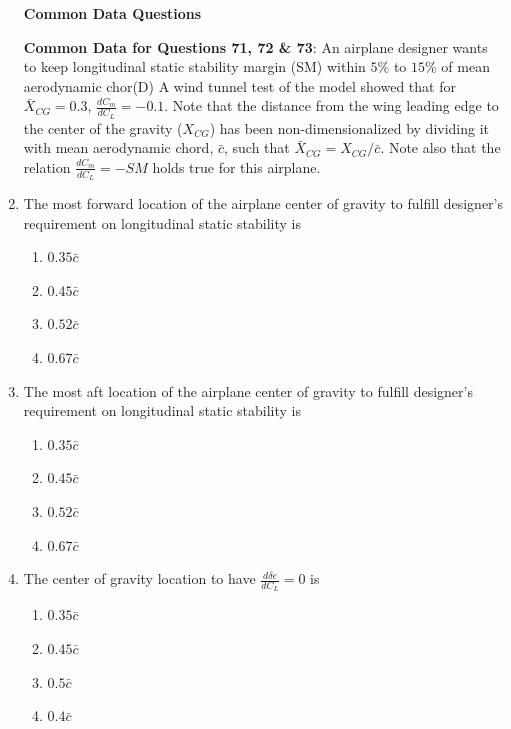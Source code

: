\documentclass{article}
\begin{document}
\begin{enumerate}
\begin{center}
    \textbf{Common Data Questions}
\end{center}


\textbf{Common Data for Questions 71, 72 \& 73}: An airplane designer wants to keep longitudinal static stability margin (SM) within $5\%$ to $15\%$ of mean aerodynamic chor(D) A wind tunnel test of the model showed that for $\bar{X}_{CG} = 0.3$, $\frac{d C_m}{d C_L} = -0.1$. Note that the distance from the wing leading edge to the center of the gravity ($X_{CG}$) has been non-dimensionalized by dividing it with mean aerodynamic chord, $\bar{c}$, such that $\bar{X}_{CG} = X_{CG} / \bar{c}$. Note also that the relation $\frac{d C_m}{d C_L} = -SM$ holds true for this airplane.

    \item The most forward location of the airplane center of gravity to fulfill designer's requirement on longitudinal static stability is
    \begin{multicols}{4}
    \begin{enumerate}
        \item $0.35 \bar{c}$
        \item $0.45 \bar{c}$
        \item $0.52 \bar{c}$
        \item $0.67 \bar{c}$
    \end{enumerate}
    \end{multicols}
    

    \item The most aft location of the airplane center of gravity to fulfill designer's requirement on longitudinal static stability is
    \begin{multicols}{4}
    \begin{enumerate}
        \item $0.35 \bar{c}$
        \item $0.45 \bar{c}$
        \item $0.52 \bar{c}$
        \item $0.67 \bar{c}$
    \end{enumerate}
    \end{multicols}
    

    \item The center of gravity location to have $\frac{d \delta e}{d C_L} = 0$ is
    \begin{multicols}{4}
    \begin{enumerate}
        \item $0.35 \bar{c}$
        \item $0.45 \bar{c}$
        \item $0.5 \bar{c}$
        \item $0.4 \bar{c}$
    \end{enumerate}
    \end{multicols}
    
\end{enumerate}
\end{document}
